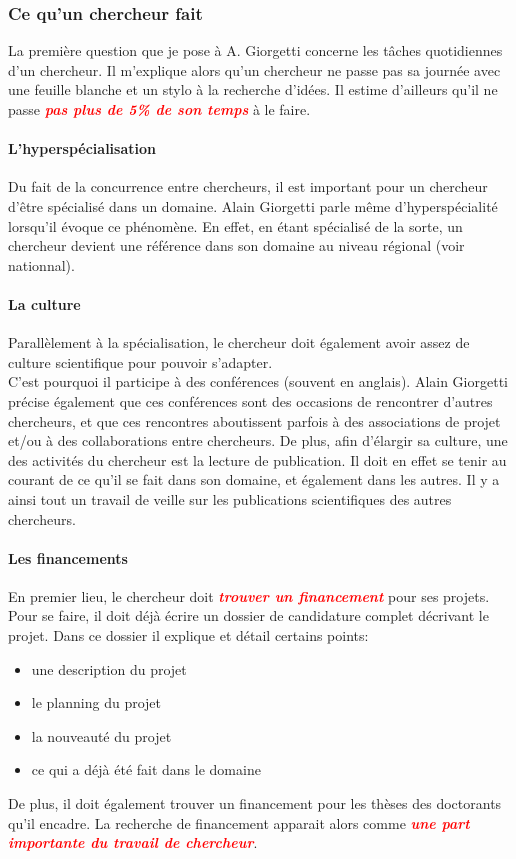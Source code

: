 \documentclass[a4paper,12pt, draft]{report}
\newcommand{\badPoint}[1]{\textcolor{red}{\textbf{\textit{#1}}}}
\begin{document}
\subsubsection{Ce qu'un chercheur fait} La première question que je pose à A. Giorgetti concerne les tâches quotidiennes d'un chercheur. Il m'explique alors qu'un chercheur ne passe pas sa journée avec une feuille blanche et un stylo à la recherche d'idées. Il estime d'ailleurs qu'il ne passe \badPoint{pas plus de 5\% de son temps} à le faire.

\paragraph{L'hyperspécialisation}
Du fait de la concurrence entre chercheurs, il est important pour un chercheur d'être spécialisé dans un domaine. Alain Giorgetti parle même d'hyperspécialité lorsqu'il évoque ce phénomène. En effet, en étant spécialisé de la sorte, un chercheur devient une référence dans son domaine au niveau régional (voir nationnal).

\paragraph{La culture}
Parallèlement à la spécialisation, le chercheur doit également avoir assez de culture scientifique pour pouvoir s'adapter. 
\\C'est pourquoi il participe à des conférences (souvent en anglais). Alain Giorgetti précise également que ces conférences sont des occasions de rencontrer d'autres chercheurs, et que ces rencontres aboutissent parfois à des associations de projet et/ou à des collaborations entre chercheurs.
De plus, afin d'élargir sa culture, une des activités du chercheur est la lecture de publication. Il doit en effet se tenir au courant de ce qu'il se fait dans son domaine, et également dans les autres. Il y a ainsi tout un travail de veille sur les publications scientifiques des autres chercheurs.


\paragraph{Les financements}
En premier lieu, le chercheur doit \badPoint{trouver un financement} pour ses projets. Pour se faire, il doit déjà écrire un dossier de candidature complet décrivant le projet. Dans ce dossier il explique et détail certains points:
\begin{itemize}
\item une description du projet
\item le planning du projet
\item la nouveauté du projet
\item ce qui a déjà été fait dans le domaine
\end{itemize}
De plus, il doit également trouver un financement pour les thèses des doctorants qu'il encadre.
La recherche de financement apparait alors comme \badPoint{une part importante du travail de chercheur}.
\end{document}
